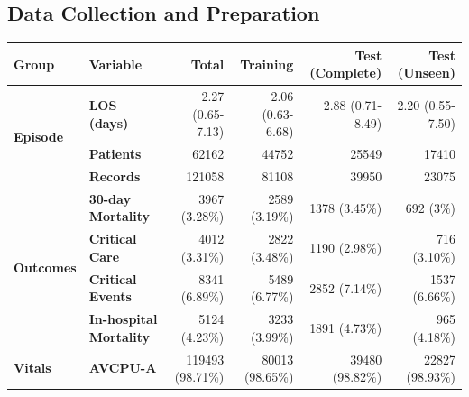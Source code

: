 \documentclass[fleqn,10pt]{wlscirep}
\begin{document}
\subsection*{Data Collection and Preparation}

\begin{table}[htbp]
    \centering
    \renewcommand{\arraystretch}{1.2}

    \begin{tabular}{llrrrr}
        \toprule

        \textbf{Group}                                                     & \textbf{Variable}              & Total             & Training          & Test (Complete)  & Test (Unseen)    \\
        \midrule
        \multirow{3}{*}{\textbf{Episode}}                                  & \textbf{LOS (days)}            & 2.27 (0.65-7.13)  & 2.06 (0.63-6.68)  & 2.88 (0.71-8.49) & 2.20 (0.55-7.50) \\
                                                                           & \textbf{Patients}              & 62162             & 44752             & 25549            & 17410            \\
                                                                           & \textbf{Records}               & 121058            & 81108             & 39950            & 23075            \\
        \cline{1-6}
        \multirow{4}{*}{\textbf{Outcomes}}                                 & \textbf{30-day Mortality}      & 3967 (3.28\%)     & 2589 (3.19\%)     & 1378 (3.45\%)    & 692 (3\%)        \\
                                                                           & \textbf{Critical Care}         & 4012 (3.31\%)     & 2822 (3.48\%)     & 1190 (2.98\%)    & 716 (3.10\%)     \\
                                                                           & \textbf{Critical Events}       & 8341 (6.89\%)     & 5489 (6.77\%)     & 2852 (7.14\%)    & 1537 (6.66\%)    \\
                                                                           & \textbf{In-hospital Mortality} & 5124 (4.23\%)     & 3233 (3.99\%)     & 1891 (4.73\%)    & 965 (4.18\%)     \\
        \cline{1-6}
        \multirow{8}{*}{\textbf{Vitals}}                                   & \textbf{AVCPU-A}               & 119493 (98.71\%)  & 80013 (98.65\%)   & 39480 (98.82\%)  & 22827 (98.93\%)  \\

\end{tabular}
\end{table}
\end{document}
